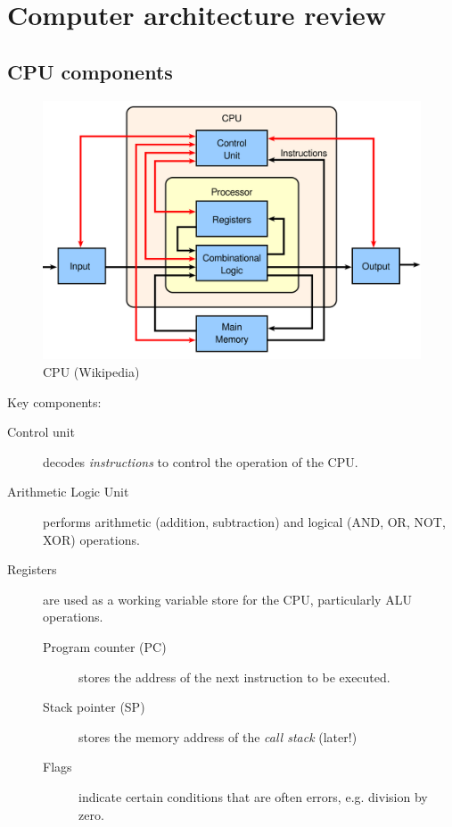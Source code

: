\chapter{Computer architecture review}
\label{ch:comparch}



\section{CPU components}

\begin{figure}[htbp]
  \centering
  \includegraphics[width=0.5\linewidth]{cpu}
  \caption{CPU (Wikipedia)}
  \label{fig:cpu}
\end{figure}

Key components:

\begin{description}
\item[Control unit] decodes \textit{instructions} to control the operation of the CPU.
\item[Arithmetic Logic Unit] performs arithmetic (addition, subtraction) and logical (AND, OR, NOT, XOR) operations.
\item[Registers] are used as a working variable store for the CPU, particularly ALU operations.
  \begin{description}
  \item[Program counter (PC)] stores the address of the next instruction to be executed.
  \item[Stack pointer (SP)] stores the memory address of the \textit{call stack} (later!)
  \item[Flags] indicate certain conditions that are often errors, e.g. division by zero. 
  \end{description}
\end{description}

